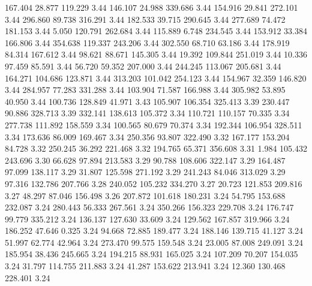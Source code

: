  167.404   28.877  119.229         3.44
 146.107   24.988  339.686         3.44
 154.916   29.841  272.101         3.44
 296.860   89.738  316.291         3.44
 182.533   39.715  290.645         3.44
 277.689   74.472  181.153         3.44
   5.050  120.791  262.684         3.44
 115.889    6.748  234.545         3.44
 153.912   33.384  166.806         3.44
 354.638  119.337  243.206         3.44
 302.550   68.710   63.186         3.44
 178.919   84.314  167.612         3.44
  98.621   88.671  145.305         3.44
  19.392  109.844  251.019         3.44
  10.336   97.459   85.591         3.44
  56.720   59.352  207.000         3.44
 244.245  113.067  205.681         3.44
 164.271  104.686  123.871         3.44
 313.203  101.042  254.123         3.44
 154.967   32.359  146.820         3.44
 284.957   77.283  331.288         3.44
 103.904   71.587  166.988         3.44
 305.982   53.895   40.950         3.44
 100.736  128.849   41.971         3.43
 105.907  106.354  325.413         3.39
 230.447   90.886  328.713         3.39
 332.141  138.613  105.372         3.34
 110.721  110.157   70.335         3.34
 277.738  111.892  158.559         3.34
 100.565   80.679   70.374         3.34
 192.344  106.954  328.511         3.34
 173.636   86.009  169.467         3.34
 250.356   93.807  322.490         3.32
 167.177  153.204   84.728         3.32
 250.245   36.292  221.468         3.32
 194.765   65.371  356.608         3.31
   1.984  105.432  243.696         3.30
  66.628   97.894  213.583         3.29
  90.788  108.606  322.147         3.29
 164.487   97.099  138.117         3.29
  31.807  125.598  271.192         3.29
 241.243   84.046  313.029         3.29
  97.316  132.786  207.766         3.28
 240.052  105.232  334.270         3.27
  20.723  121.853  209.816         3.27
  48.297   87.046  156.498         3.26
 207.872  101.618  180.231         3.24
  54.795  153.688  232.087         3.24
 280.443   56.333  267.561         3.24
 350.266  156.323  229.708         3.24
 176.747   99.779  335.212         3.24
 136.137  127.630   33.609         3.24
 129.562  167.857  319.966         3.24
 186.252   47.646    0.325         3.24
  94.668   72.885  189.477         3.24
 188.146  139.715   41.127         3.24
  51.997   62.774   42.964         3.24
 273.470   99.575  159.548         3.24
  23.005   87.008  249.091         3.24
 185.954   38.436  245.665         3.24
 194.215   88.931  165.025         3.24
 107.209   70.207  154.035         3.24
  31.797  114.755  211.883         3.24
  41.287  153.622  213.941         3.24
  12.360  130.468  228.401         3.24
